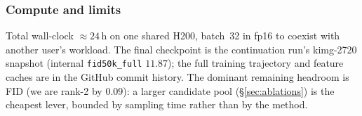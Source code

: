\documentclass{article}
\begin{document}
\subsubsection*{Compute and limits}
Total wall-clock $\approx 24$\,h on one shared H200, batch~32 in fp16 to coexist
with another user's workload. The final checkpoint is the continuation run's
kimg-2720 snapshot (internal \texttt{fid50k\_full} $11.87$); the full training
trajectory and feature caches are in the GitHub commit history. The dominant
remaining headroom is FID (we are rank-2 by $0.09$): a larger candidate pool
(\S\ref{sec:ablations}) is the cheapest lever, bounded by sampling time rather
than by the method.



\end{document}
